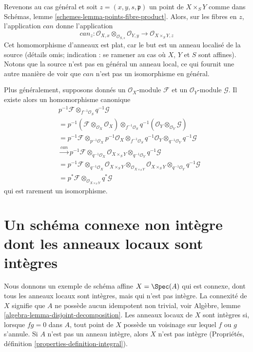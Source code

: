 \medskip\noindent
Revenons au cas général et soit $z = (x, y, s, \mathfrak p)$
un point de $X \times_S Y$ comme dans
Schémas, lemme \ref{schemes-lemma-points-fibre-product}.
Alors, sur les fibres en $z$, l'application $can$ donne l'application
$$
can_z :
\mathcal{O}_{X, x} \otimes_{\mathcal{O}_{S, s}} \mathcal{O}_{Y, y}
\longrightarrow
\mathcal{O}_{X \times_S Y, z}
$$
Cet homomorphisme d'anneaux est plat, car le but est un anneau localisé de la
source (détails omis; indication : se ramener au cas où $X$, $Y$ et $S$
sont affines).
Notons que la source n'est pas en général un anneau local, ce qui fournit
une autre manière de voir que $can$ n'est pas un isomorphisme en général.

\medskip\noindent
Plus généralement, supposons donnés un $\mathcal{O}_X$-module $\mathcal{F}$ et un
$\mathcal{O}_Y$-module $\mathcal{G}$. Il existe alors un homomorphisme canonique
\begin{align*}
& p^{-1}\mathcal{F} \otimes_{f^{-1}\mathcal{O}_S} q^{-1}\mathcal{G} \\
& =
p^{-1}(\mathcal{F} \otimes_{\mathcal{O}_X} \mathcal{O}_X)
\otimes_{f^{-1}\mathcal{O}_S}
q^{-1}(\mathcal{O}_Y \otimes_{\mathcal{O}_Y} \mathcal{G}) \\
& =
p^{-1}\mathcal{F} \otimes_{p^{-1}\mathcal{O}_X} p^{-1}\mathcal{O}_X
\otimes_{f^{-1}\mathcal{O}_S}
q^{-1}\mathcal{O}_Y \otimes_{q^{-1}\mathcal{O}_Y} q^{-1}\mathcal{G} \\
& \xrightarrow{can}
p^{-1}\mathcal{F} \otimes_{q^{-1}\mathcal{O}_X}
\mathcal{O}_{X \times_S Y}
\otimes_{q^{-1}\mathcal{O}_Y} q^{-1}\mathcal{G}  \\
& =
p^{-1}\mathcal{F} \otimes_{q^{-1}\mathcal{O}_X}
\mathcal{O}_{X \times_S Y}
\otimes_{\mathcal{O}_{X \times_S Y}}
\mathcal{O}_{X \times_S Y}
\otimes_{q^{-1}\mathcal{O}_Y} q^{-1}\mathcal{G}  \\
& =
p^*\mathcal{F} \otimes_{\mathcal{O}_{X \times_S Y}} q^*\mathcal{G}
\end{align*}
qui est rarement un isomorphisme.





\section{Un schéma connexe non intègre dont les anneaux locaux sont intègres}
\label{section-connected-locally-integral-not-integral}

\noindent
Nous donnons un exemple de schéma affine $X = \Spec(A)$ qui est
connexe, dont tous les anneaux locaux sont intègres, mais qui n'est pas intègre.
La connexité de $X$ signifie que $A$ ne possède aucun idempotent non trivial, voir
Algèbre, lemme \ref{algebra-lemma-disjoint-decomposition}.
Les anneaux locaux de $X$ sont intègres si, lorsque $fg = 0$ dans $A$, tout
point de $X$ possède un voisinage sur lequel $f$ ou $g$ s'annule.
Si $A$ n'est pas un anneau intègre, alors $X$ n'est pas intègre
(Propriétés, définition \ref{properties-definition-integral}).

